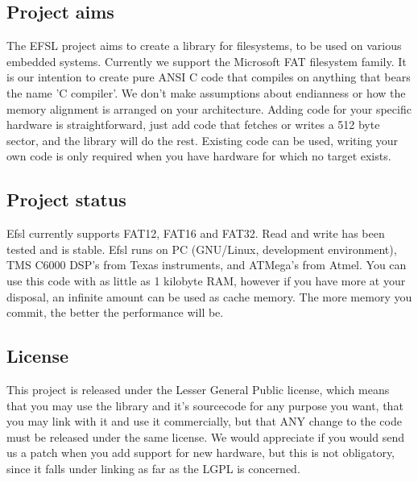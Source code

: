 \subsection{Project aims}
The EFSL project aims to create a library for filesystems, to be used on
various embedded systems. Currently we support the Microsoft FAT filesystem
family. It is our intention to create pure ANSI C code that compiles on
anything that bears the name 'C compiler'. We don't make assumptions about
endianness or how the memory alignment is arranged on your architecture.
\newline\newline
Adding code for your specific hardware is straightforward, just add code that
fetches or writes a 512 byte sector, and the library will do the rest.
Existing code can be used, writing your own code is only required when you
have hardware for which no target exists.
\subsection{Project status}
Efsl currently supports FAT12, FAT16 and FAT32. Read and write has been tested
and is stable. Efsl runs on PC (GNU/Linux, development environment),
TMS C6000 DSP's from Texas instruments, and ATMega's from Atmel.
You can use this code with as little as 1 kilobyte RAM, however if you have
more at your disposal, an infinite amount can be used as cache memory.
The more memory you commit, the better the performance will be.
\subsection{License}
This project is released under the Lesser General Public license, which
means that you may use the library and it's sourcecode for any purpose you want,
that you may link with it and use it commercially, but that ANY change to the
code must be released under the same license. We would appreciate if you would  send
us a patch when you add support for new hardware, but this is not obligatory, since it
falls under linking as far as the LGPL is concerned.
